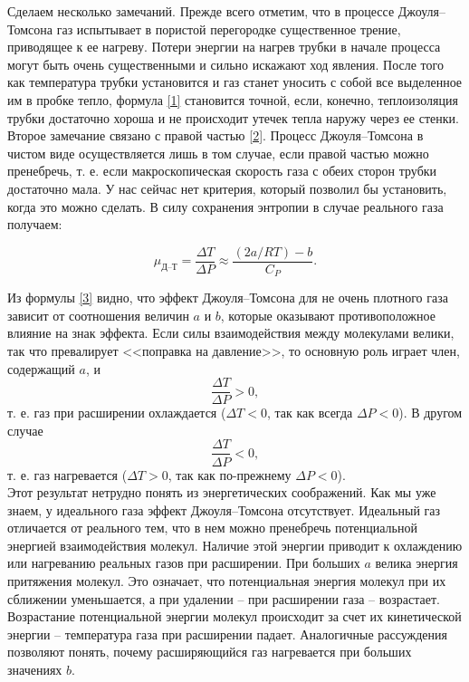\documentclass[a4paper, 12pt]{article}
\begin{document}
    \noindent Сделаем несколько замечаний. Прежде всего отметим, что в процессе Джоуля–Томсона газ испытывает в пористой перегородке существенное трение, приводящее к ее нагреву. Потери энергии на нагрев трубки в начале процесса могут быть очень существенными и сильно искажают ход явления. После того как температура трубки установится и газ станет уносить с собой все выделенное им в пробке тепло, формула \eqref{1} становится точной, если, конечно, теплоизоляция трубки достаточно хороша и не происходит утечек тепла наружу через ее стенки.\\

    \noindent Второе замечание связано с правой частью \eqref{2}. Процесс Джоуля–Томсона в чистом виде осуществляется лишь в том случае, если правой частью можно пренебречь, т. е. если макроскопическая скорость газа с обеих сторон трубки достаточно мала. У нас сейчас нет критерия, который позволил бы установить, когда это можно сделать. В силу сохранения энтропии в случае реального газа получаем:

    \begin{equation}
        \label{3}
        \mu_\text{Д--Т} = \frac{\Delta T}{\Delta P} \approx \frac{(2a/RT) - b}{C_P}.
    \end{equation}

    \noindent Из формулы \eqref{3} видно, что эффект Джоуля–Томсона для не очень плотного газа зависит от соотношения величин $a$ и $b$, которые оказывают противоположное влияние на знак эффекта. Если силы взаимодействия между молекулами велики, так что превалирует <<поправка на давление>>, то основную роль играет член, содержащий $a$, и \[ \frac{\Delta T}{\Delta P} > 0, \] т. е. газ при расширении охлаждается ($\Delta T < 0$, так как всегда $\Delta P < 0 $). В другом случае \[ \frac{\Delta T}{\Delta P} < 0, \] т. е. газ нагревается ($ \Delta T > 0 $, так как по-прежнему $ \Delta P < 0 $).\\

    \noindent Этот результат нетрудно понять из энергетических соображений. Как мы уже знаем, у идеального газа эффект Джоуля–Томсона отсутствует. Идеальный газ отличается от реального тем, что в нем можно пренебречь потенциальной энергией взаимодействия молекул. Наличие этой энергии приводит к охлаждению или нагреванию реальных газов при расширении. При больших $a$ велика энергия притяжения молекул. Это означает, что потенциальная энергия молекул при их сближении уменьшается, а при удалении -- при расширении газа -- возрастает. Возрастание потенциальной энергии молекул происходит за счет их кинетической энергии -- температура газа при расширении падает. Аналогичные рассуждения позволяют понять, почему расширяющийся газ нагревается при больших значениях $b$.\\
\end{document}
